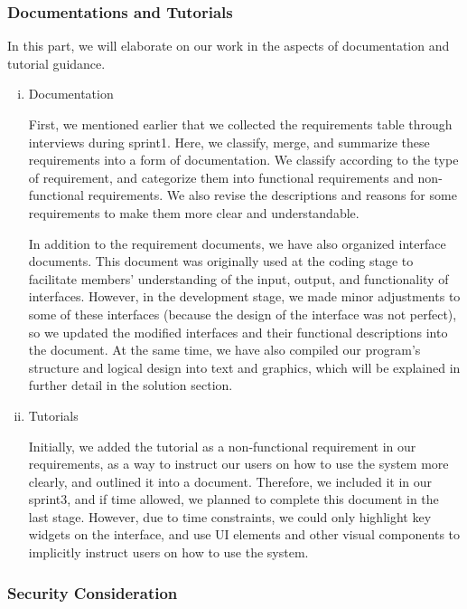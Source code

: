 \subsubsection{Documentations and Tutorials}

In this part, we will elaborate on our work in the aspects of documentation and tutorial guidance. 

\begin{enumerate}[(i)]
\item Documentation

First, we mentioned earlier that we collected the requirements table through interviews during sprint1. Here, we classify, merge, and summarize these requirements into a form of documentation. We classify according to the type of requirement, and categorize them into functional requirements and non-functional requirements. We also revise the descriptions and reasons for some requirements to make them more clear and understandable. 

In addition to the requirement documents, we have also organized interface documents. This document was originally used at the coding stage to facilitate members' understanding of the input, output, and functionality of interfaces. However, in the development stage, we made minor adjustments to some of these interfaces (because the design of the interface was not perfect), so we updated the modified interfaces and their functional descriptions into the document. At the same time, we have also compiled our program's structure and logical design into text and graphics, which will be explained in further detail in the solution section.

\item Tutorials

Initially, we added the tutorial as a non-functional requirement in our requirements, as a way to instruct our users on how to use the system more clearly, and outlined it into a document. Therefore, we included it in our sprint3, and if time allowed, we planned to complete this document in the last stage. However, due to time constraints, we could only highlight key widgets on the interface, and use UI elements and other visual components to implicitly instruct users on how to use the system.

\end{enumerate}

\subsubsection{Security Consideration} 

